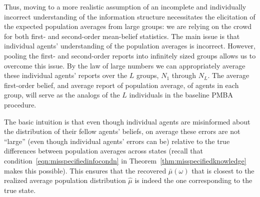 \documentclass[12pt,reqno]{amsart}
\begin{document}
Thus, moving to a more realistic assumption of an incomplete and individually incorrect understanding of the information structure necessitates the elicitation of the expected population averages from large groups: we are relying on the crowd for both first- and second-order mean-belief statistics. The main issue is that individual agents' understanding of the population averages is incorrect. However, pooling the first- and second-order reports into infinitely sized groups allows us to overcome this issue. By the law of large numbers we can appropriately average these individual agents' reports over the $L$ groups, $N_1$ through $N_L$. The average first-order belief, and average report of population average, of agents in each group, will serve as the analogs of the $L$ individuals in the baseline PMBA procedure.

The basic intuition is that even though individual agents are misinformed about the distribution of their fellow agents' beliefs, on average these errors are not ``large'' (even though individual agents' errors can be) relative to the true differences between population averages across states (recall that condition~\eqref{eqn:misspecifiedinfocondn} in Theorem~\ref{thm:misspecifiedknowledge} makes this possible). This ensures that the recovered $\bar{\mu}(\omega)$ that is closest to the realized average population distribution $\hat{\mu}$ is indeed the one corresponding to the true state.
\end{document}
